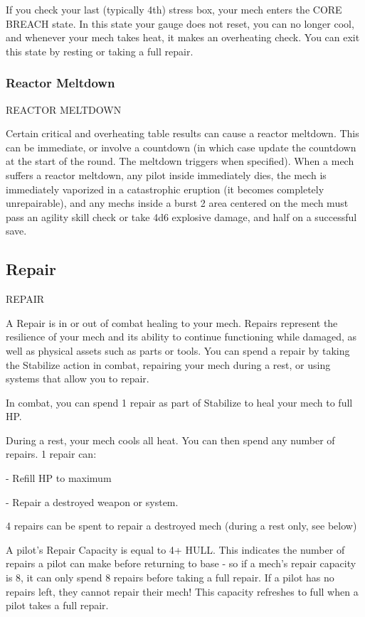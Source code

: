 If you check your last (typically 4th) stress box, your mech enters the CORE BREACH state. In
this state your gauge does not reset, you can no longer cool, and whenever your mech takes
heat, it makes an overheating check. You can exit this state by resting or taking a full repair.

\subsubsection{Reactor Meltdown}

                                      REACTOR MELTDOWN

Certain critical and overheating table results can cause a reactor meltdown. This can be
immediate, or involve a countdown (in which case update the countdown at the start of the
round. The meltdown triggers when specified). When a mech suffers a reactor meltdown, any
pilot inside immediately dies, the mech is immediately vaporized in a catastrophic eruption (it
becomes completely unrepairable), and any mechs inside a burst 2 area centered on the mech
must pass an agility skill check or take 4d6 explosive damage, and half on a successful save.


\subsection{Repair}

                                               REPAIR

A Repair is in or out of combat healing to your mech. Repairs represent the resilience of your
mech and its ability to continue functioning while damaged, as well as physical assets such as
parts or tools. You can spend a repair by taking the Stabilize action in combat, repairing your
mech during a rest, or using systems that allow you to repair.


In combat, you can spend 1 repair as part of Stabilize to heal your mech to full HP.


During a rest, your mech cools all heat. You can then spend any number of repairs. 1 repair can:

    -    Refill HP to maximum

    -    Repair a destroyed weapon or system.

4 repairs can be spent to repair a destroyed mech (during a rest only, see below)


A pilot’s Repair Capacity is equal to 4+ HULL. This indicates the number of repairs a pilot can
make before returning to base - so if a mech’s repair capacity is 8, it can only spend 8 repairs
before taking a full repair. If a pilot has no repairs left, they cannot repair their mech! This
capacity refreshes to full when a pilot takes a full repair.


